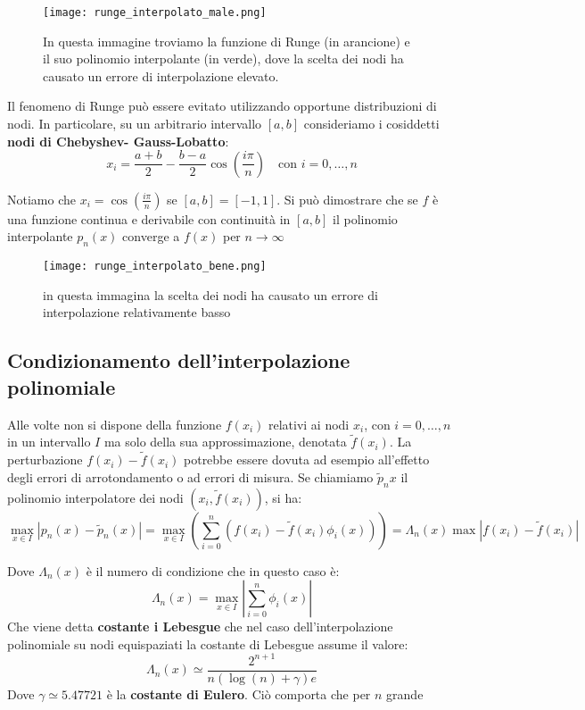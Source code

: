 \begin{figure}[h!]
    \centering
    \texttt{[image: runge\_interpolato\_male.png]}
    \caption{In questa immagine troviamo la funzione di Runge (in arancione) e il suo polinomio interpolante (in verde), dove la scelta dei nodi ha causato un errore di interpolazione elevato.}
    \label{fig:runge_interpolazione}
\end{figure}

Il fenomeno di Runge può essere evitato utilizzando opportune distribuzioni di nodi. In
particolare, su un arbitrario intervallo $[a, b]$ consideriamo i cosiddetti \textbf{nodi di Chebyshev-
Gauss-Lobatto}:
\[
    x_i = \frac{a+b}{2} - \frac{b-a}{2} \cos{(\frac{i\pi}{n})} \quad \text{con }i= 0 ,\dots, n   
\]

Notiamo che $x_i = \cos{(\frac{i\pi}{n})}$ se $[a,b] = [-1,1]$. Si può dimostrare che se $f$ è una funzione continua e derivabile con continuità in $[a,b]$ il polinomio interpolante $p_n(x)$ converge a $f(x)$ per $n\to\infty$

\begin{figure}[h!]
    \centering
    \texttt{[image: runge\_interpolato\_bene.png]}
    \caption{in questa immagina la scelta dei nodi ha causato un errore di interpolazione relativamente basso}
    \label{fig:runge_interpolazione_bella}
\end{figure}

\subsection{Condizionamento dell’interpolazione polinomiale}

Alle volte non si dispone della funzione $f(x_i)$ relativi ai nodi $x_i$, con $i=0,\dots, n$ in un intervallo $I$ ma solo della sua approssimazione, denotata $\tilde{f}(x_i)$. La  perturbazione $f(x_i) - \tilde{f}(x_i)$ potrebbe essere dovuta ad esempio all'effetto degli errori di arrotondamento o ad errori di misura. Se chiamiamo $\tilde{p}_n{x}$ il polinomio interpolatore dei nodi $(x_i, \tilde{f}(x_i))$, si ha:
\[
    \max_{x\in I} |p_n(x) - \tilde{p}_n(x)| = \max_{x\in I}(\sum^n_{i=0}(f(x_i)-\tilde{f}(x_i)\phi_i(x))) =  \Lambda_n (x) \max |f(x_i) - \tilde{f}(x_i)|
\]

Dove $\Lambda_n (x)$ è il numero di condizione che in questo caso è:
\[
    \Lambda_n (x) = \max_{x\in I} |\sum_{i=0}^{n}\phi_i(x)|
\]
Che viene detta \textbf{costante i Lebesgue} che nel caso dell’interpolazione polinomiale su nodi equispaziati la costante di Lebesgue assume il valore:
\[
    \Lambda_n(x) \simeq \frac{2^{n+1}}{n(\log(n) + \gamma) e}    
\]
Dove $\gamma \simeq 5.47721$ è la \textbf{costante di Eulero}. Ciò comporta che per $n$ grande 